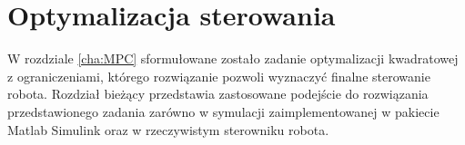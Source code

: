 \chapter{Optymalizacja sterowania}
\label{cha:opt}

W rozdziale \ref{cha:MPC} sformułowane zostało zadanie optymalizacji kwadratowej z ograniczeniami, którego rozwiązanie pozwoli wyznaczyć finalne sterowanie robota. Rozdział bieżący przedstawia zastosowane podejście do rozwiązania przedstawionego zadania zarówno w symulacji zaimplementowanej w pakiecie Matlab Simulink oraz w rzeczywistym sterowniku robota. 

